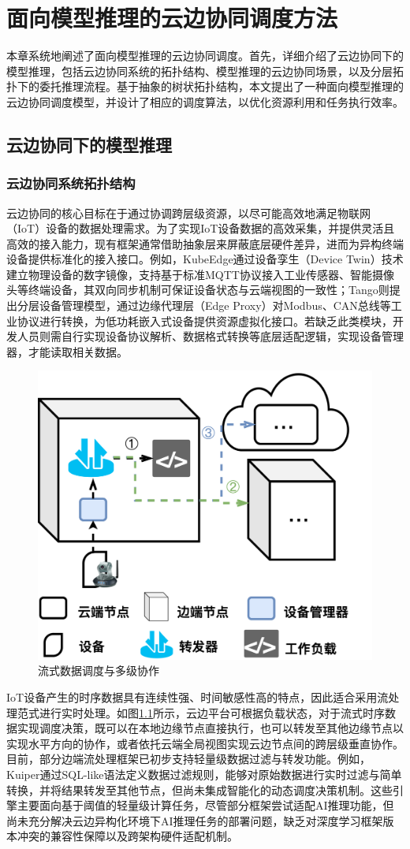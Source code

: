 
\chapter{面向模型推理的云边协同调度方法}

本章系统地阐述了面向模型推理的云边协同调度。首先，详细介绍了云边协同下的模型推理，包括云边协同系统的拓扑结构、模型推理的云边协同场景，以及分层拓扑下的委托推理流程。基于抽象的树状拓扑结构，本文提出了一种面向模型推理的云边协同调度模型，并设计了相应的调度算法，以优化资源利用和任务执行效率。

\section{云边协同下的模型推理}

\subsection{云边协同系统拓扑结构}

云边协同的核心目标在于通过协调跨层级资源，以尽可能高效地满足物联网（IoT）设备的数据处理需求。为了实现IoT设备数据的高效采集，并提供灵活且高效的接入能力，现有框架通常借助抽象层来屏蔽底层硬件差异，进而为异构终端设备提供标准化的接入接口。例如，KubeEdge\cite{xiong2018extend}通过设备孪生（Device Twin）技术建立物理设备的数字镜像，支持基于标准MQTT协议接入工业传感器、智能摄像头等终端设备，其双向同步机制可保证设备状态与云端视图的一致性；Tango\cite{bagchi2017tango}则提出分层设备管理模型，通过边缘代理层（Edge Proxy）对Modbus、CAN总线等工业协议进行转换，为低功耗嵌入式设备提供资源虚拟化接口。若缺乏此类模块，开发人员则需自行实现设备协议解析、数据格式转换等底层适配逻辑，实现设备管理器，才能读取相关数据。

\begin{figure}[ht]
  \centering
  \includegraphics[width=0.45\linewidth]{pics/3-1流处理.png}
  \caption{流式数据调度与多级协作}
  \label{fig:3-1flow}
\end{figure}

IoT设备产生的时序数据具有连续性强、时间敏感性高的特点，因此适合采用流处理范式进行实时处理\cite{de2018distributed,wang2020edge}。如图\ref{fig:3-1flow}所示，云边平台可根据负载状态，对于流式时序数据实现调度决策，既可以在本地边缘节点直接执行，也可以转发至其他边缘节点以实现水平方向的协作，或者依托云端全局视图实现云边节点间的跨层级垂直协作。目前，部分边端流处理框架已初步支持轻量级数据过滤与转发功能。例如，Kuiper\cite{ekuiper}通过SQL-like语法定义数据过滤规则，能够对原始数据进行实时过滤与简单转换，并将结果转发至其他节点，但尚未集成智能化的动态调度决策机制。这些引擎主要面向基于阈值的轻量级计算任务，尽管部分框架尝试适配AI推理功能，但尚未充分解决云边异构化环境下AI推理任务的部署问题，缺乏对深度学习框架版本冲突的兼容性保障以及跨架构硬件适配机制。

